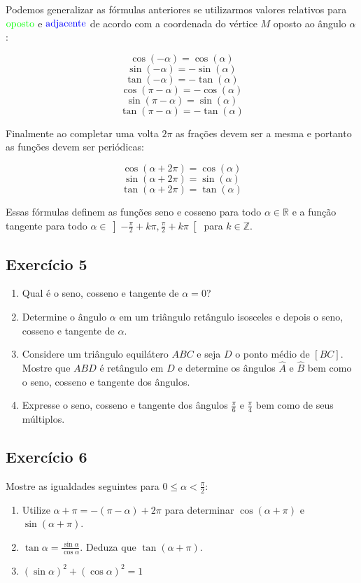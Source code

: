 Podemos generalizar as fórmulas anteriores se utilizarmos valores relativos para
$\color{green}{\text{oposto}}$ e ${\text{\color{blue}{\text{adjacente}}}}$
de acordo com a coordenada do vértice $M$ oposto ao ângulo $\alpha$:

$$\cos{(-\alpha)} = \cos{(\alpha)}$$
$$\sin{(-\alpha)} = -\sin{(\alpha)}$$
$$\tan{(-\alpha)} = -\tan{(\alpha)}$$
$$\cos{(\pi-\alpha)} = -\cos{(\alpha)}$$
$$\sin{(\pi-\alpha)} = \sin{(\alpha)}$$
$$\tan{(\pi-\alpha)} = -\tan{(\alpha)}$$

Finalmente ao completar uma volta $2\pi$ as frações devem ser a mesma e portanto
as funções devem ser periódicas:

$$\cos{(\alpha+2\pi)} = \cos{(\alpha)}$$
$$\sin{(\alpha+2\pi)} = \sin{(\alpha)}$$
$$\tan{(\alpha+2\pi)} = \tan{(\alpha)}$$

Essas fórmulas definem as funções seno e cosseno para todo
$\alpha \in \mathbb R$ e a função tangente para todo
$\alpha \in \left]{-\frac{\pi}{2} + k\pi}, {\frac{\pi}{2} +k\pi} \right[$
para $k \in \mathbb Z$. 

\subsection{Exercício 5}

\begin{enumerate}
  \item Qual é o seno, cosseno e tangente de $\alpha = 0$?
  \item Determine o ângulo $\alpha$ em um triângulo retângulo isosceles
    e depois o seno, cosseno e tangente de $\alpha$.
  \item Considere um triângulo equilátero $ABC$ e seja $D$ o ponto médio
    de $[BC]$. Mostre que $ABD$ é retângulo em $D$ e determine os
    ângulos $\widehat{A}$ e $\widehat{B}$
    bem como o seno, cosseno e tangente dos ângulos.
  \item Expresse o seno, cosseno e tangente dos ângulos
    $\frac{\pi}{6}$ e $\frac{\pi}{4}$ bem como de seus múltiplos.
\end{enumerate}

\subsection{Exercício 6}

Mostre as igualdades seguintes para
 $0 \leq \alpha < \frac{\pi}{2}$:

\begin{enumerate}
\item Utilize $\alpha + \pi = -\left(\pi-\alpha\right) + 2\pi$ para determinar
  $\cos\left(\alpha+\pi\right)$ e $\sin\left(\alpha+\pi\right)$.
\item $\tan \alpha = \frac{\sin \alpha}{\cos \alpha}$. Deduza que 
  $\tan \left(\alpha+\pi\right)$.
\item $\left(\sin \alpha\right)^2 + \left(\cos \alpha\right)^2 = 1$
\end{enumerate}

